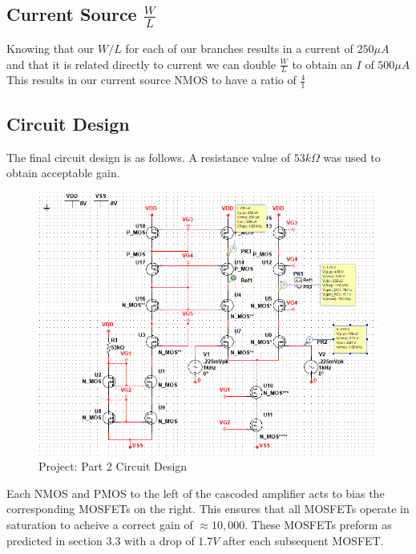 \documentclass[12pt]{article}
\begin{document}
	\subsection{Current Source $\frac{W}{L}$}
	Knowing that our $W/L$ for each of our branches results in a current of $250 \mu A$ and that it is related directly to current we can double $\frac{W}{L}$ to obtain an $I$ of $500\mu A$ This results in our current source NMOS to have a ratio of $\frac{4}{1}$
	
	
	\subsection{Circuit Design}
	The final circuit design is as follows.  A resistance value of $53k \Omega$ was used to obtain acceptable gain.
		\begin{figure}[h!]
		\label{fig:amp}
		\caption{Project: Part 2 Circuit Design}
		\centering
		\includegraphics[width=1\textwidth]{fullcircuit}
	\end{figure}
\newpage

	Each NMOS and PMOS to the left of the cascoded amplifier acts to bias the corresponding MOSFETs on the right. This ensures that all MOSFETs operate in saturation to acheive a correct gain of $\approx 10,000$. These MOSFETs preform as predicted in section 3.3 with a drop of $1.7V$ after each subsequent MOSFET.
	
\end{document}
